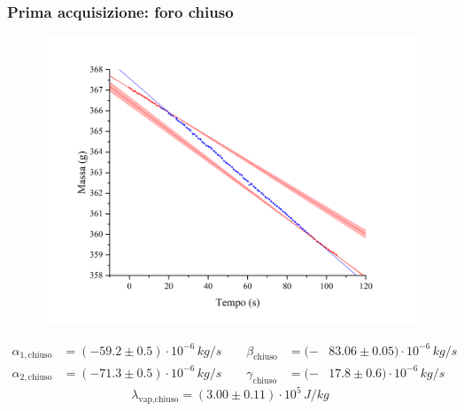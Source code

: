 \documentclass{article}
\begin{document}
\subsubsection{Prima acquisizione: foro chiuso}
\begin{figure}[H]
  \includegraphics[trim={2.5cm 0.6cm 3cm 1cm},clip,width=\textwidth]{img/g_azoto2.png}
\end{figure}
\[\begin{aligned}
  \alpha_{1,\text{chiuso}} &= (-59.2\pm0.5)\cdot10^{-6}\,\unit{kg\per s}
  \qquad
  \beta_{\text{chiuso}}\!\!\!\!&=(-&83.06\pm0.05)\cdot10^{-6}\,\unit{kg\per s}
  \\
  \alpha_{2,\text{chiuso}} &= (-71.3\pm0.5)\cdot10^{-6}\,\unit{kg\per s}
  \qquad
  \gamma_\text{chiuso}\!\!\!\!&=(-&17.8\pm0.6)\cdot10^{-6}\,\unit{kg\per s}
\end{aligned}\]
\[
  \lambda_\text{vap,chiuso} = (3.00\pm0.11)\cdot10^5\,\unit{J \per kg}
\]

\pagebreak
\end{document}
